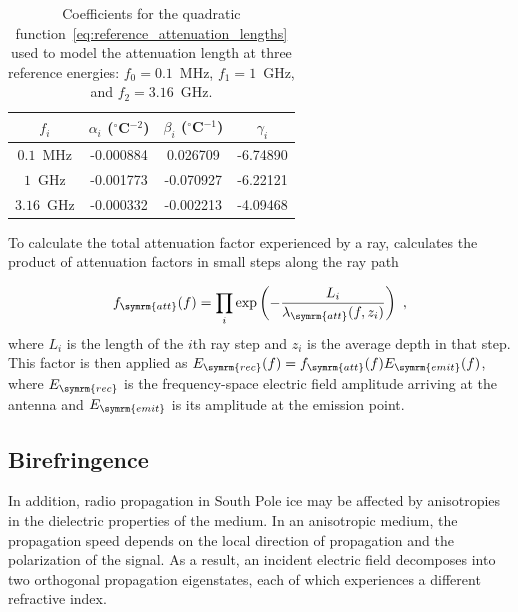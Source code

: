             \begin{table}[]
                \centering
                \begin{tabularx}{\linewidth}{c S S S}
                    \toprule
                    {$f_i$} & {$\alpha_i$ ($^\circ$C$^{-2}$)} & {$\beta_i$ ($^\circ$C$^{-1}$)} & {$\gamma_i$} \\
                    \midrule
                    $0.1$~MHz & -0.000884 & 0.026709 & -6.74890\\
                    $1$~GHz & -0.001773 & -0.070927 & -6.22121 \\
                    $3.16$~GHz & -0.000332 & -0.002213 & -4.09468 \\
                    \bottomrule
                \end{tabularx}
                \caption{Coefficients for the quadratic function~\eqref{eq:reference_attenuation_lengths} used to model the attenuation length at three reference energies: $f_0=0.1$~MHz, $f_1=1$~GHz, and $f_2=3.16$~GHz.
                \label{tab:attenuation_length_coefficients}}
            \end{table}

            To calculate the total attenuation factor experienced by a ray, \arasim{} calculates the product of attenuation factors in small steps along the ray path

            \begin{align}
                f_{\symrm{att}}(f) = \prod_i \exp\left(-\frac{L_i}{\lambda_{\symrm{att}}(f,z_i)}\right)~,
            \end{align}
            where $L_i$ is the length of the $i$th ray step and $z_i$ is the average depth in that step.
            This factor is then applied as $E_{\symrm{rec}}(f) = f_{\symrm{att}}(f) E_{\symrm{emit}}(f)$, where $E_{\symrm{rec}}$ is the frequency-space electric field amplitude arriving at the antenna and $E_{\symrm{emit}}$ is its amplitude at the emission point.

            \subsection{Birefringence}
            
            In addition, radio propagation in South Pole ice may be affected by anisotropies in the dielectric properties of the medium.
            In an anisotropic medium, the propagation speed depends on the local direction of propagation and the polarization of the signal.
            As a result, an incident electric field decomposes into two orthogonal propagation eigenstates, each of which experiences a different refractive index.

